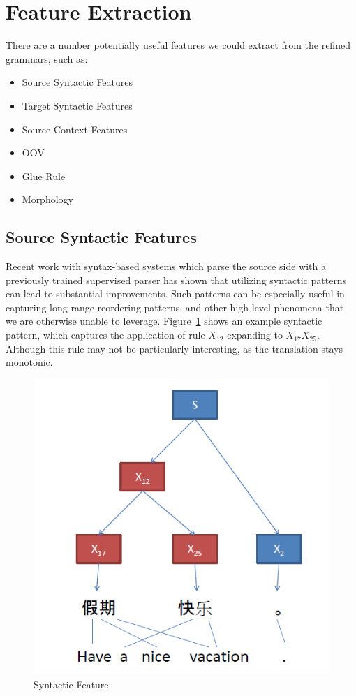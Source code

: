 \section{Feature Extraction}
There are a number potentially useful features we could extract from the refined grammars, such as:
\begin{itemize}
\item Source Syntactic Features
\item Target Syntactic Features
\item Source Context Features
\item OOV
\item Glue Rule
\item Morphology
\end{itemize}


\subsection{Source Syntactic Features}

Recent work with syntax-based systems which parse the source side with a previously trained supervised parser has shown that utilizing syntactic patterns can lead to substantial improvements. Such patterns can be especially useful in capturing long-range reordering patterns, and other high-level phenomena that we are otherwise unable to leverage. Figure~\ref{fig:synt_feat1} shows an example syntactic pattern, which captures the application of rule $X_{12}$ expanding to $X_{17}X_{25}$. Although this rule may not be particularly interesting, as the translation stays monotonic. 

\begin{figure}[h]
	\centering
		\includegraphics[scale=0.5]{training_img_files/synt_feat1.PNG}
	\caption{Syntactic Feature}
	\label{fig:synt_feat1}
\end{figure}

